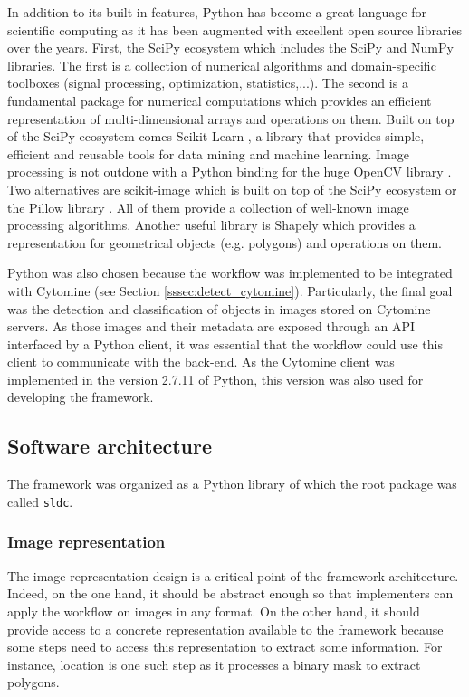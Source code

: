 In addition to its built-in features, Python has become a great language for scientific computing as it has been augmented with excellent open source libraries over the years. First, the SciPy ecosystem which includes the SciPy \cite{oliphant:2007} and NumPy \cite{vanderwalt:2011} libraries. The first is a collection of numerical algorithms and domain-specific toolboxes (signal processing, optimization, statistics,...). The second is a fundamental package for numerical computations which provides an efficient representation of multi-dimensional arrays and operations on them. Built on top of the SciPy ecosystem comes Scikit-Learn \cite{pedregosa:2011}, a library that provides simple, efficient and reusable tools for data mining and machine learning. Image processing is not outdone with a Python binding for the huge OpenCV library \cite{opencv_library}. Two alternatives are scikit-image \cite{scikit-image} which is built on top of the SciPy ecosystem or the Pillow library \cite{pillow}. All of them provide a collection of well-known image processing algorithms. Another useful library is Shapely \cite{shapely} which provides a representation for geometrical objects (e.g. polygons) and operations on them. 

Python was also chosen because the workflow was implemented to be integrated with Cytomine (see Section \ref{sssec:detect_cytomine}). Particularly, the final goal was the detection and classification of objects in images stored on Cytomine servers. As those images and their metadata are exposed through an API interfaced by a Python client, it was essential that the workflow could use this client to communicate with the back-end. As the Cytomine client was implemented in the version 2.7.11 of Python, this version was also used for developing the framework. 

\subsection{Software architecture}
\label{ssec:work_arch}
The framework was organized as a Python library of which the root package was called \texttt{sldc}. 

\subsubsection{Image representation} 
\label{sssec:work_image_repr}
The image representation design is a critical point of the framework architecture. Indeed, on the one hand, it should be abstract enough so that implementers can apply the workflow on images in any format. On the other hand, it should provide access to a concrete representation available to the framework because some steps need to access this representation to extract some information. For instance, location is one such step as it processes a binary mask to extract polygons. 

